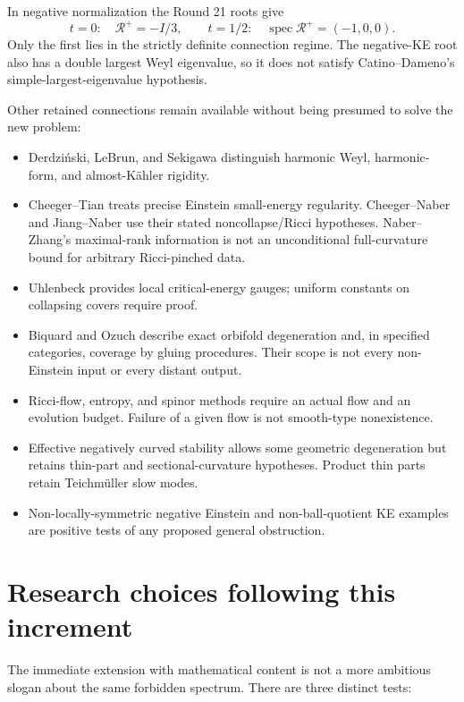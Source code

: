 \documentclass[
  11pt,
]{article}
\providecommand{\tightlist}{%
  \setlength{\itemsep}{0pt}\setlength{\parskip}{0pt}}
\begin{document}
In negative normalization the Round 21 roots give \[
t=0:\quad\mathcal R^+=-I/3,\qquad
t=1/2:\quad\operatorname{spec}\mathcal R^+=(-1,0,0).
\] Only the first lies in the strictly definite connection regime. The
negative-KE root also has a double largest Weyl eigenvalue, so it does
not satisfy Catino--Dameno's simple-largest-eigenvalue hypothesis.

Other retained connections remain available without being presumed to
solve the new problem:

\begin{itemize}
\tightlist
\item
  Derdziński, LeBrun, and Sekigawa distinguish harmonic Weyl,
  harmonic-form, and almost-Kähler rigidity.
\item
  Cheeger--Tian treats precise Einstein small-energy regularity.
  Cheeger--Naber and Jiang--Naber use their stated noncollapse/Ricci
  hypotheses. Naber--Zhang's maximal-rank information is not an
  unconditional full-curvature bound for arbitrary Ricci-pinched data.
\item
  Uhlenbeck provides local critical-energy gauges; uniform constants on
  collapsing covers require proof.
\item
  Biquard and Ozuch describe exact orbifold degeneration and, in
  specified categories, coverage by gluing procedures. Their scope is
  not every non-Einstein input or every distant output.
\item
  Ricci-flow, entropy, and spinor methods require an actual flow and an
  evolution budget. Failure of a given flow is not smooth-type
  nonexistence.
\item
  Effective negatively curved stability allows some geometric
  degeneration but retains thin-part and sectional-curvature hypotheses.
  Product thin parts retain Teichmüller slow modes.
\item
  Non-locally-symmetric negative Einstein and non-ball-quotient KE
  examples are positive tests of any proposed general obstruction.
\end{itemize}

\hypertarget{research-choices-following-this-increment}{%
\section{Research choices following this
increment}\label{research-choices-following-this-increment}}

The immediate extension with mathematical content is not a more
ambitious slogan about the same forbidden spectrum. There are three
distinct tests:
\end{document}
